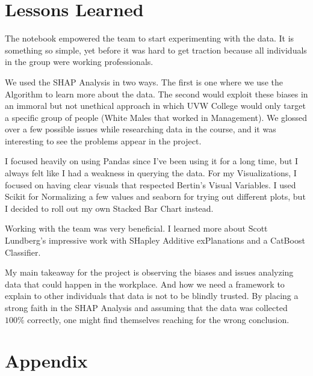 \documentclass{IEEEtran}
\begin{document}
\section{Lessons Learned}

The notebook empowered the team to start experimenting with the data. It is something so simple, yet before it was hard to get traction because all individuals in the group were working professionals.

We used the SHAP Analysis in two ways. The first is one where we use the Algorithm to learn more about the data. The second would exploit these biases in an immoral but not unethical approach in which UVW College would only target a specific group of people (White Males that worked in Management). We glossed over a few possible issues while researching data in the course, and it was interesting to see the problems appear in the project.

I focused heavily on using Pandas since I've been using it for a long time, but I always felt like I had a weakness in querying the data. For my Visualizations, I focused on having clear visuals that respected Bertin's Visual Variables. I used Scikit for Normalizing a few values and seaborn for trying out different plots, but I decided to roll out my own Stacked Bar Chart instead.

Working with the team was very beneficial. I learned more about  Scott Lundberg's impressive work with SHapley Additive exPlanations and a CatBoost Classifier.

My main takeaway for the project is observing the biases and issues analyzing data that could happen in the workplace. And how we need a framework to explain to other individuals that data is not to be blindly trusted. By placing a strong faith in the SHAP Analysis and assuming that the data was collected $100\%$ correctly, one might find themselves reaching for the wrong conclusion.

\section{Appendix}





\end{document}
